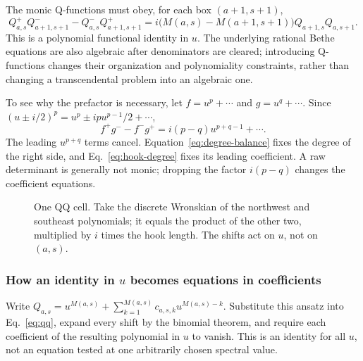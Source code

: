 \documentclass[11pt]{article}
\begin{document}
The monic Q-functions must obey, for each box $(a+1,s+1)$,
\begin{equation}
 \label{eq:qq}
 Q_{a,s}^{+}Q_{a+1,s+1}^{-}-Q_{a,s}^{-}Q_{a+1,s+1}^{+}
 =i\bigl(M(a,s)-M(a+1,s+1)\bigr)Q_{a+1,s}Q_{a,s+1}.
\end{equation}
This is a polynomial functional identity in $u$. The underlying rational
Bethe equations are also algebraic after denominators are cleared;
introducing Q-functions changes their organization and polynomiality
constraints, rather than changing a transcendental problem into an
algebraic one.

To see why the prefactor is necessary, let $f=u^p+\cdots$ and
$g=u^q+\cdots$. Since
$(u\pm i/2)^p=u^p\pm ipu^{p-1}/2+\cdots$,
\begin{equation}
 \label{eq:wron-leading}
 f^+g^- -f^-g^+=i(p-q)u^{p+q-1}+\cdots.
\end{equation}
The leading $u^{p+q}$ terms cancel. Equation~\eqref{eq:degree-balance}
fixes the degree of the right side, and Eq.~\eqref{eq:hook-degree}
fixes its leading coefficient. A raw determinant is generally not monic;
dropping the factor $i(p-q)$ changes the coefficient equations.

\begin{figure}[htbp]
\centering
{}
\caption{One QQ cell. Take the discrete Wronskian of the northwest and
southeast polynomials; it equals the product of the other two, multiplied
by $i$ times the hook length. The shifts act on $u$, not on $(a,s)$.}
\label{fig:qq-cell}
\end{figure}

\subsubsection*{How an identity in $u$ becomes equations in coefficients}
Write
$Q_{a,s}=u^{M(a,s)}+\sum_{k=1}^{M(a,s)}c_{a,s,k}u^{M(a,s)-k}$.
Substitute this ansatz into Eq.~\eqref{eq:qq}, expand every shift by the
binomial theorem, and require each coefficient of the resulting
polynomial in $u$ to vanish. This is an identity for all $u$, not an
equation tested at one arbitrarily chosen spectral value.
\end{document}

